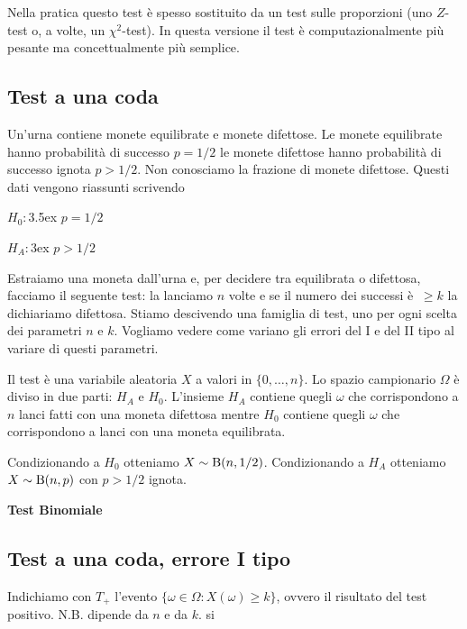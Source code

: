 \documentclass[12pt,openany]{book}
\theoremstyle{mio}
\theoremstyle{liscio}
\begin{document}
\def\medrel#1{\parbox[t]{6ex}{$\displaystyle\hfil #1$}}
\def\ceq#1#2#3{\parbox[t]{15ex}{$\displaystyle #1$}\medrel{#2}$\displaystyle  #3$}

Nella pratica questo test è spesso sostituito da un test sulle proporzioni (uno $Z$-test o, a volte, un $\chi^2$-test). In questa versione il test è computazionalmente più pesante ma concettualmente più semplice.

\subsection{Test a una coda}\label{Bernoulli_test}

Un'urna contiene monete equilibrate e monete difettose. Le monete equilibrate hanno probabilità di successo $p=1/2$ le monete difettose hanno probabilità di successo ignota $p>1/2$. Non conosciamo la frazione di monete difettose. Questi dati vengono riassunti scrivendo

$H_0:$\kern3.5ex $p=1/2$

$H_A:$\kern3ex $p>1/2$
 
Estraiamo una moneta dall'urna e, per decidere tra equilibrata o difettosa, facciamo il seguente test: la lanciamo $n$ volte e se il numero dei successi è $\ \ge k$ la dichiariamo difettosa. Stiamo descivendo una famiglia di test, uno per ogni scelta dei parametri $n$ e $k$. Vogliamo vedere come variano gli errori del I e del II tipo al variare di questi parametri. 

Il test è una variabile aleatoria $X$ a valori in $\{0,\dots,n\}$. Lo spazio campionario $\Omega$ è diviso in due parti: $H_A$ e $H_0$.  L'insieme $H_A$ contiene quegli $\omega$ che corrispondono a $n$ lanci fatti con una moneta difettosa mentre $H_0$ contiene quegli $\omega$ che corrispondono a lanci con una moneta equilibrata. 

Condizionando a $H_0$ otteniamo $X\sim {\rm B}(n,1/2)$. Condizionando a $H_A$ otteniamo $X\sim {\rm B}(n,p)$ con $p>1/2$ ignota.


\hfill{}\clearpage\hfill\textbf{Test Binomiale}\subsection{Test a una coda, errore I tipo}

Indichiamo con $T_+$ l'evento $\{\omega\in\Omega: X(\omega)\ge k\}$, ovvero il risultato del test positivo. N.B. dipende da $n$ e da $k$.
si
\end{document}
